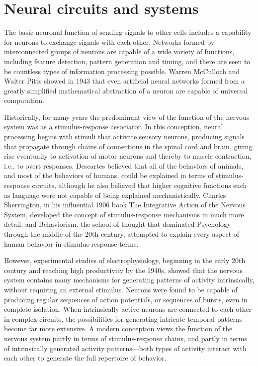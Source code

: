 \hypertarget{neural-circuits-and-systems}{%
\section{Neural circuits and systems}\label{neural-circuits-and-systems}}

The basic neuronal function of sending signals to other cells includes a capability for neurons to exchange signals with each other. Networks formed by interconnected groups of neurons are capable of a wide variety of functions, including feature detection, pattern generation and timing, and there are seen to be countless types of information processing possible. Warren McCulloch and Walter Pitts showed in 1943 that even artificial neural networks formed from a greatly simplified mathematical abstraction of a neuron are capable of universal computation.

Historically, for many years the predominant view of the function of the nervous system was as a stimulus-response associator. In this conception, neural processing begins with stimuli that activate sensory neurons, producing signals that propagate through chains of connections in the spinal cord and brain, giving rise eventually to activation of motor neurons and thereby to muscle contraction, i.e., to overt responses. Descartes believed that all of the behaviors of animals, and most of the behaviors of humans, could be explained in terms of stimulus-response circuits, although he also believed that higher cognitive functions such as language were not capable of being explained mechanistically. Charles Sherrington, in his influential 1906 book The Integrative Action of the Nervous System, developed the concept of stimulus-response mechanisms in much more detail, and Behaviorism, the school of thought that dominated Psychology through the middle of the 20th century, attempted to explain every aspect of human behavior in stimulus-response terms.

However, experimental studies of electrophysiology, beginning in the early 20th century and reaching high productivity by the 1940s, showed that the nervous system contains many mechanisms for generating patterns of activity intrinsically, without requiring an external stimulus. Neurons were found to be capable of producing regular sequences of action potentials, or sequences of bursts, even in complete isolation. When intrinsically active neurons are connected to each other in complex circuits, the possibilities for generating intricate temporal patterns become far more extensive. A modern conception views the function of the nervous system partly in terms of stimulus-response chains, and partly in terms of intrinsically generated activity patterns---both types of activity interact with each other to generate the full repertoire of behavior.

